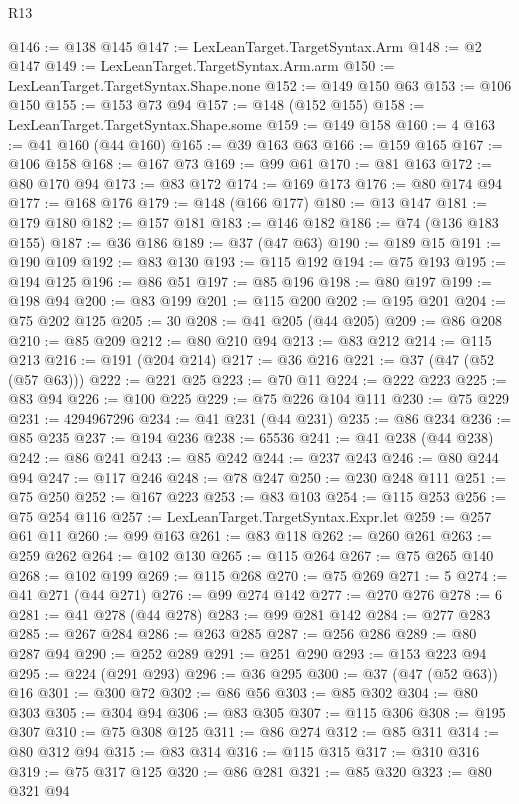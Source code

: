 \begin{lexlean}{R13}
\begin{coremodule}
@146 := @138 @145
@147 := LexLeanTarget.TargetSyntax.Arm
@148 := @2 @147
@149 := LexLeanTarget.TargetSyntax.Arm.arm
@150 := LexLeanTarget.TargetSyntax.Shape.none
@152 := @149 @150 @63
@153 := @106 @150
@155 := @153 @73 @94
@157 := @148 (@152 @155)
@158 := LexLeanTarget.TargetSyntax.Shape.some
@159 := @149 @158
@160 := 4
@163 := @41 @160 (@44 @160)
@165 := @39 @163 @63
@166 := @159 @165
@167 := @106 @158
@168 := @167 @73
@169 := @99 @61
@170 := @81 @163
@172 := @80 @170 @94
@173 := @83 @172
@174 := @169 @173
@176 := @80 @174 @94
@177 := @168 @176
@179 := @148 (@166 @177)
@180 := @13 @147
@181 := @179 @180
@182 := @157 @181
@183 := @146 @182
@186 := @74 (@136 @183 @155)
@187 := @36 @186
@189 := @37 (@47 @63)
@190 := @189 @15
@191 := @190 @109
@192 := @83 @130
@193 := @115 @192
@194 := @75 @193
@195 := @194 @125
@196 := @86 @51
@197 := @85 @196
@198 := @80 @197
@199 := @198 @94
@200 := @83 @199
@201 := @115 @200
@202 := @195 @201
@204 := @75 @202 @125
@205 := 30
@208 := @41 @205 (@44 @205)
@209 := @86 @208
@210 := @85 @209
@212 := @80 @210 @94
@213 := @83 @212
@214 := @115 @213
@216 := @191 (@204 @214)
@217 := @36 @216
@221 := @37 (@47 (@52 (@57 @63)))
@222 := @221 @25
@223 := @70 @11
@224 := @222 @223
@225 := @83 @94
@226 := @100 @225
@229 := @75 @226 @104 @111
@230 := @75 @229
@231 := 4294967296
@234 := @41 @231 (@44 @231)
@235 := @86 @234
@236 := @85 @235
@237 := @194 @236
@238 := 65536
@241 := @41 @238 (@44 @238)
@242 := @86 @241
@243 := @85 @242
@244 := @237 @243
@246 := @80 @244 @94
@247 := @117 @246
@248 := @78 @247
@250 := @230 @248 @111
@251 := @75 @250
@252 := @167 @223
@253 := @83 @103
@254 := @115 @253
@256 := @75 @254 @116
@257 := LexLeanTarget.TargetSyntax.Expr.let
@259 := @257 @61 @11
@260 := @99 @163
@261 := @83 @118
@262 := @260 @261
@263 := @259 @262
@264 := @102 @130
@265 := @115 @264
@267 := @75 @265 @140
@268 := @102 @199
@269 := @115 @268
@270 := @75 @269
@271 := 5
@274 := @41 @271 (@44 @271)
@276 := @99 @274 @142
@277 := @270 @276
@278 := 6
@281 := @41 @278 (@44 @278)
@283 := @99 @281 @142
@284 := @277 @283
@285 := @267 @284
@286 := @263 @285
@287 := @256 @286
@289 := @80 @287 @94
@290 := @252 @289
@291 := @251 @290
@293 := @153 @223 @94
@295 := @224 (@291 @293)
@296 := @36 @295
@300 := @37 (@47 (@52 @63)) @16
@301 := @300 @72
@302 := @86 @56
@303 := @85 @302
@304 := @80 @303
@305 := @304 @94
@306 := @83 @305
@307 := @115 @306
@308 := @195 @307
@310 := @75 @308 @125
@311 := @86 @274
@312 := @85 @311
@314 := @80 @312 @94
@315 := @83 @314
@316 := @115 @315
@317 := @310 @316
@319 := @75 @317 @125
@320 := @86 @281
@321 := @85 @320
@323 := @80 @321 @94

\end{coremodule}
\end{lexlean}
